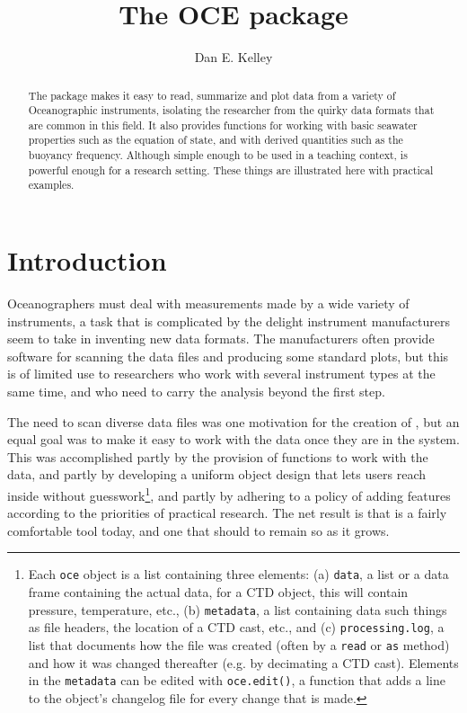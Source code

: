 \documentclass{article}
\begin{document}
\title{The OCE package}
\author{Dan E. Kelley}
\maketitle


\begin{abstract}

The \verb@oce@ package makes it easy to read, summarize and plot data from a
variety of Oceanographic instruments, isolating the researcher from the quirky
data formats that are common in this field. It also provides functions for
working with basic seawater properties such as the equation of state, and with
derived quantities such as the buoyancy frequency.  Although simple enough to be
used in a teaching context, \verb@oce@ is powerful enough for a research
setting.  These things are illustrated here with practical examples.

\end{abstract}

\section{Introduction}

Oceanographers must deal with measurements made by a wide variety of
instruments, a task that is complicated by the delight instrument manufacturers
seem to take in inventing new data formats. The manufacturers often provide
software for scanning the data files and producing some standard plots, but this
is of limited use to researchers who work with several instrument types at the
same time, and who need to carry the analysis beyond the first step.

The need to scan diverse data files was one motivation for the creation of
\verb@oce@, but an equal goal was to make it easy to work with the data once
they are in the system.  This was accomplished partly by the provision of
functions to work with the data, and partly by developing a uniform object
design that lets users reach inside without guesswork\footnote{Each \texttt{oce}
  object is a list containing three elements: (a) \texttt{data}, a list or a
  data frame containing the actual data, for a CTD object, this will contain
  pressure, temperature, etc., (b) \texttt{metadata}, a list containing data
  such things as file headers, the location of a CTD cast, etc., and (c)
  \texttt{processing.log}, a list that documents how the file was created (often
  by a \texttt{read} or \texttt{as} method) and how it was changed thereafter
  (e.g. by decimating a CTD cast).  Elements in the \texttt{metadata} can be
  edited with \texttt{oce.edit()}, a function that adds
  a line to the object's changelog file for every change that is made.}, and
partly by adhering to a policy of adding features according to the priorities of
practical research. The net result is that \verb@oce@ is a fairly comfortable
tool today, and one that should to remain so as it grows.
\end{document}
